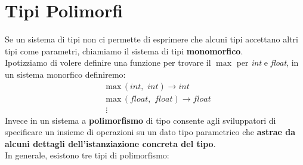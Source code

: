 \documentclass[a4paper,12pt]{article}
\begin{document}
\section{Tipi Polimorfi}
Se un sistema di tipi non ci permette di esprimere che alcuni tipi accettano altri tipi come parametri, chiamiamo il sistema di tipi \textbf{monomorfico}.\\
Ipotizziamo di volere definire una funzione per trovare il $\max$ per \textit{int} e \textit{float}, in un sistema monorfico definiremo:
\begin{align*}
  & \text{max} \, (int, \,\, int) \to int \\
    & \text{max} \, (float, \,\, float) \to float \\
    & \vdots
\end{align*}
Invece in un sistema a \textbf{polimorfismo} di tipo consente agli sviluppatori di specificare un
insieme di operazioni su un dato tipo parametrico che \textbf{astrae da alcuni dettagli
dell'istanziazione concreta del tipo}.\\
In generale, esistono tre tipi di polimorfismo:
\end{document}
